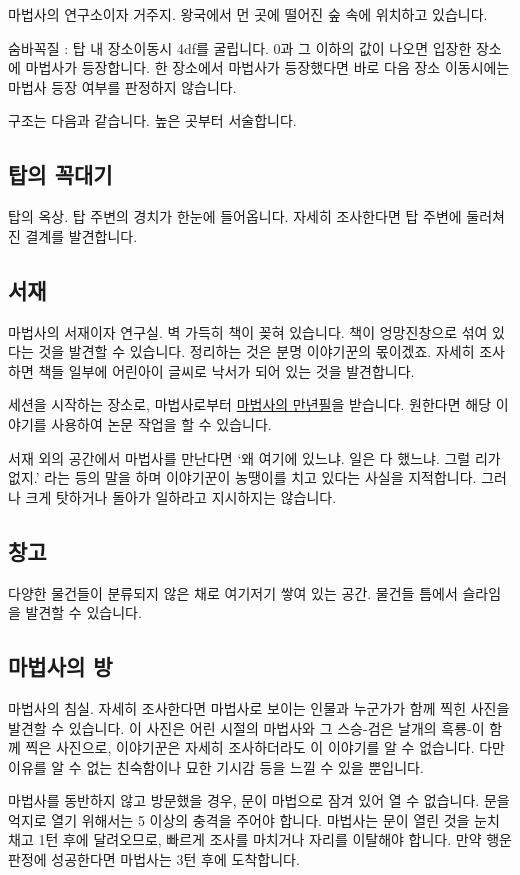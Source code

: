 \documentclass{report}
\begin{document}
	마법사의 연구소이자 거주지. 왕국에서 먼 곳에 떨어진 숲 속에 위치하고 있습니다.
	
	숨바꼭질 : 탑 내 장소이동시 4df를 굴립니다. 0과 그 이하의 값이 나오면 입장한 장소에 마법사가 등장합니다. 한 장소에서 마법사가 등장했다면 바로 다음 장소 이동시에는 마법사 등장 여부를 판정하지 않습니다.
	
	구조는 다음과 같습니다. 높은 곳부터 서술합니다.

	\subsection*{탑의 꼭대기}
		탑의 옥상. 탑 주변의 경치가 한눈에 들어옵니다. 자세히 조사한다면 탑 주변에 둘러쳐진 결계를 발견합니다.
	
	\subsection*{서재}
		마법사의 서재이자 연구실. 벽 가득히 책이 꽂혀 있습니다. 책이 엉망진창으로 섞여 있다는 것을 발견할 수 있습니다. 정리하는 것은 분명 이야기꾼의 몫이겠죠. 자세히 조사하면 책들 일부에 어린아이 글씨로 낙서가 되어 있는 것을 발견합니다.
		
		세션을 시작하는 장소로, 마법사로부터 \hyperlink{item:fountain-pen}{마법사의 만년필}을 받습니다. 원한다면 해당 이야기를 사용하여 논문 작업을 할 수 있습니다.
		
		서재 외의 공간에서 마법사를 만난다면 `왜 여기에 있느냐. 일은 다 했느냐. 그럴 리가 없지.' 라는 등의 말을 하며 이야기꾼이 농땡이를 치고 있다는 사실을 지적합니다. 그러나 크게 탓하거나 돌아가 일하라고 지시하지는 않습니다.
	
	\subsection*{창고}
		다양한 물건들이 분류되지 않은 채로 여기저기 쌓여 있는 공간. 물건들 틈에서 슬라임을 발견할 수 있습니다.
	
	\subsection*{마법사의 방}
		마법사의 침실. 자세히 조사한다면 마법사로 보이는 인물과 누군가가 함께 찍힌 사진을 발견할 수 있습니다. 이 사진은 어린 시절의 마법사와 그 스승-검은 날개의 흑룡-이 함께 찍은 사진으로, 이야기꾼은 자세히 조사하더라도 이 이야기를 알 수 없습니다. 다만 이유를 알 수 없는 친숙함이나 묘한 기시감 등을 느낄 수 있을 뿐입니다.
		
		마법사를 동반하지 않고 방문했을 경우, 문이 마법으로 잠겨 있어 열 수 없습니다. 문을 억지로 열기 위해서는 5 이상의 충격을 주어야 합니다. 마법사는 문이 열린 것을 눈치 채고 1턴 후에 달려오므로, 빠르게 조사를 마치거나 자리를 이탈해야 합니다. 만약 행운 판정에 성공한다면 마법사는 3턴 후에 도착합니다.
		
\end{document}
